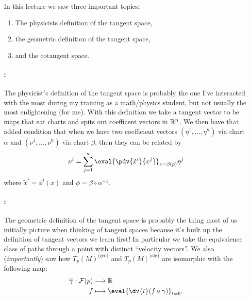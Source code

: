 \documentclass{homework}
\begin{document}
In this lecture we saw three important topics:
\begin{enumerate}
	\item The physicists definition of the tangent space,\label{it:phys}
	\item the geometric definition of the tangent space,\label{it:geo}
	\item and the cotangent space.\label{it:cotangent}
\end{enumerate}

\paragraph{:} The physicist's definition of the tangent space is probably the one I've interacted with the most during my training as a math/physics student, but not usually the most enlightening (for me).
With this definition we take a tangent vector to be maps that eat charts and spits out coefficent vectors in $\mathbb{R}^n$.
We then have that added condition that when we have two coefficient vectors $(\eta^1,\ldots, \eta^n)$ via chart $\alpha$ and $(\nu^1,\ldots,\nu^n)$ via chart $\beta$, then they can be related by
\begin{equation*}
	\nu^i = \sum_{j = 1}^n \eval{\pdv{\tilde{x}^i}{x^j}}_{x = \beta(p)}\eta^j
\end{equation*}
where $\tilde{x}^i = \phi^i(x)$ and $\phi = \beta\circ\alpha^{-1}$.

\paragraph{:} The geometric definition of the tangent space is probably the thing most of us initially picture when thinking of tangent spaces because it's built up the definition of tangent vectors we learn first!
In particular we take the equivalence class of paths through a point with distinct ``velocity vectors''.
We also (\emph{importantly}) saw how $T_p(M)^\text{(geo)}$ and $T_p(M)^\text{(alg)}$ are isomorphic with the following map:
\begin{align*}
	\overline{\gamma}: \mathcal{F}(p) & \longrightarrow \R \\
	f & \longmapsto \eval{\dv{t}(f\circ \gamma)}_{t = 0}.
\end{align*}
\end{document}
